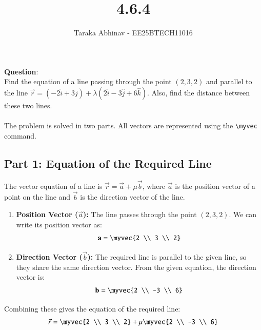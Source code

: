\documentclass[journal]{IEEEtran}
\newcommand{\mat}[1]{\mathbf{#1}}
\begin{document}


\title{4.6.4}
\author{Taraka Abhinav - EE25BTECH11016}
{\let\newpage\relax\maketitle}

\renewcommand{\thefigure}{\theenumi}
\renewcommand{\thetable}{\theenumi}
\setlength{\intextsep}{10pt}

\renewcommand{\thetable}{\theenumi}

\textbf{Question}:\\
Find the equation of a line passing through the point $(2, 3, 2)$ and parallel to the line $\vec{r} = (-2\hat{i} + 3\hat{j}) + \lambda(2\hat{i} - 3\hat{j} + 6\hat{k})$. Also, find the distance between these two lines.
\\

\solution \\
The problem is solved in two parts. All vectors are represented using the \verb|\myvec| command.

\subsection*{Part 1: Equation of the Required Line}
The vector equation of a line is $\vec{r} = \vec{a} + \mu\vec{b}$, where $\vec{a}$ is the position vector of a point on the line and $\vec{b}$ is the direction vector of the line.

\begin{enumerate}
    \item \textbf{Position Vector ($\vec{a}$):} The line passes through the point $(2, 3, 2)$. We can write its position vector as:
    \begin{align}
    \mat{a} = \myvec{2 \\ 3 \\ 2}
    \end{align}
    
    \item \textbf{Direction Vector ($\vec{b}$):} The required line is parallel to the given line, so they share the same direction vector. From the given equation, the direction vector is:
    \begin{align}
    \mat{b} = \myvec{2 \\ -3 \\ 6}
    \end{align}
\end{enumerate}
Combining these gives the equation of the required line:
\begin{align}
\vec{r} = \myvec{2 \\ 3 \\ 2} + \mu \myvec{2 \\ -3 \\ 6}
\end{align}
\end{document}

